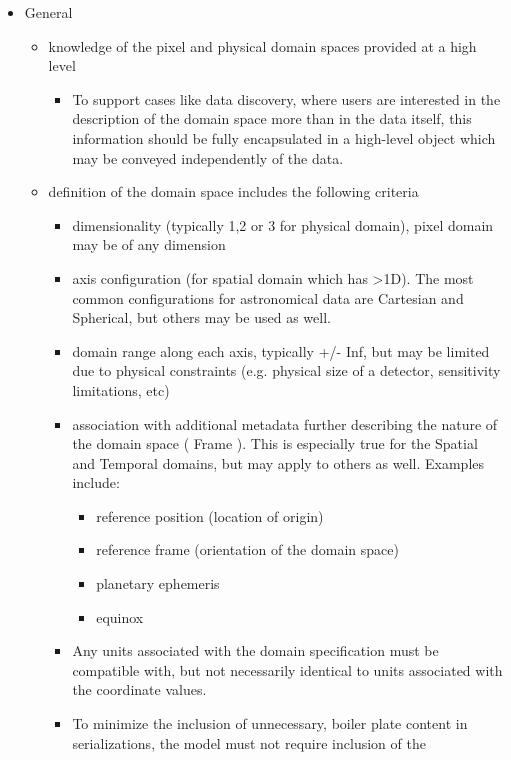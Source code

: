 \documentclass[11pt,a4paper]{ivoa}
\begin{document}
  \begin{itemize}
    \item General
    \begin{itemize}
       \item knowledge of the pixel and physical domain spaces provided at a high level
       \begin{itemize}
          \item To support cases like data discovery, where users are interested in the 
            description of the domain space more than in the data itself, this information should 
            be fully encapsulated in a high-level object which may be conveyed independently 
            of the data.
       \end{itemize}
       \item definition of the domain space includes the following criteria
       \begin{itemize}
          \item dimensionality (typically 1,2 or 3 for physical domain), pixel domain may be of any dimension
          \item axis configuration (for spatial domain which has >1D).  The most common configurations for astronomical data are Cartesian and Spherical, but others may be used as well.
          \item domain range along each axis, typically +/- Inf, but may be limited due to physical constraints (e.g. physical size of a detector, sensitivity limitations, etc)
          \item association with additional metadata further describing the nature of the domain space ( Frame ).  This is especially true for the Spatial and Temporal domains, but may apply to others as well.  Examples include:
          \begin{itemize}
             \item reference position (location of origin)
             \item reference frame (orientation of the domain space)
             \item planetary ephemeris
             \item equinox
          \end{itemize}
          \item Any units associated with the domain specification must be compatible with, but not necessarily identical to units associated with the coordinate values.
          \item To minimize the inclusion of unnecessary, boiler plate content in serializations, the model must not require inclusion of the

\end{itemize}
\end{itemize}
\end{itemize}
\end{document}
